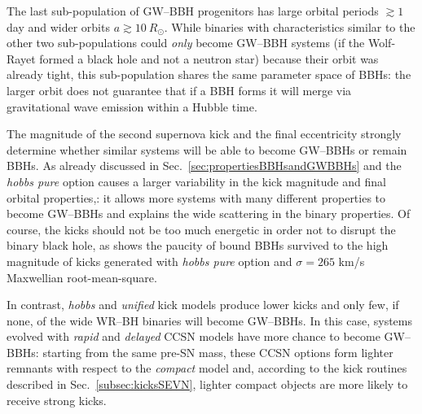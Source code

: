 \documentclass[a4paper,titlepage]{book}     	%
\newcommand{\rsun}{R_{\odot}}
\begin{document}
The last sub-population of GW--BBH progenitors has large orbital periods $\gtrsim 1$ day and wider orbits $a \gtrsim 10~\rsun$. While binaries with characteristics similar to the other two sub-populations could \emph{only} become GW--BBH systems (if the Wolf-Rayet formed a black hole and not a neutron star) because their orbit was already tight, this sub-population shares the same parameter space of BBHs: the larger orbit does not guarantee that if a BBH forms it will merge via gravitational wave emission within a Hubble time. 

The magnitude of the second supernova kick and the final eccentricity strongly determine whether similar systems will be able to become GW--BBHs or remain BBHs. As already discussed in Sec.\ \ref{sec:propertiesBBHsandGWBBHs} and the \emph{hobbs pure} option causes a larger variability in the kick magnitude and final orbital properties,: it allows more systems with many different properties to become GW--BBHs and explains the wide scattering in the binary properties. Of course, the kicks should not be too much energetic in order not to disrupt the binary black hole, as shows the paucity of bound BBHs survived to the high magnitude of kicks generated with \emph{hobbs pure} option and $\sigma = 265$ km/s Maxwellian root-mean-square. 

In contrast, \emph{hobbs} and \emph{unified} kick models produce lower kicks and only few, if none, of the wide WR--BH binaries will become GW--BBHs. In this case, systems evolved with \emph{rapid} and \emph{delayed} CCSN models have more chance to become GW--BBHs: starting from the same pre-SN mass, these CCSN options form lighter remnants with respect to the \emph{compact} model and, according to the kick routines described in Sec.\ \ref{subsec:kicksSEVN}, lighter compact objects are more likely to receive strong kicks.
\end{document}
